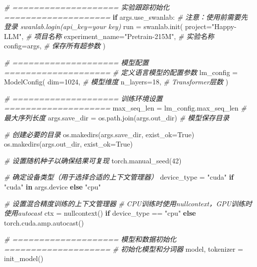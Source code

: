 \documentclass[
]{article}
\newenvironment{Shaded}{}{}
\newcommand{\CommentTok}[1]{\textcolor[rgb]{0.38,0.63,0.69}{\textit{#1}}}
\newcommand{\ControlFlowTok}[1]{\textcolor[rgb]{0.00,0.44,0.13}{\textbf{#1}}}
\newcommand{\DecValTok}[1]{\textcolor[rgb]{0.25,0.63,0.44}{#1}}
\newcommand{\KeywordTok}[1]{\textcolor[rgb]{0.00,0.44,0.13}{\textbf{#1}}}
\newcommand{\NormalTok}[1]{#1}
\newcommand{\OperatorTok}[1]{\textcolor[rgb]{0.40,0.40,0.40}{#1}}
\newcommand{\StringTok}[1]{\textcolor[rgb]{0.25,0.44,0.63}{#1}}
\newcommand{\VariableTok}[1]{\textcolor[rgb]{0.10,0.09,0.49}{#1}}
\begin{document}
\begin{Shaded}
\begin{Highlighting}[]
    \CommentTok{\# ==================== 实验跟踪初始化 ====================}
    \ControlFlowTok{if}\NormalTok{ args.use\_swanlab:}
        \CommentTok{\# 注意：使用前需要先登录 swanlab.login(api\_key=\textquotesingle{}your key\textquotesingle{})}
\NormalTok{        run }\OperatorTok{=}\NormalTok{ swanlab.init(}
\NormalTok{            project}\OperatorTok{=}\StringTok{"Happy{-}LLM"}\NormalTok{,  }\CommentTok{\# 项目名称}
\NormalTok{            experiment\_name}\OperatorTok{=}\StringTok{"Pretrain{-}215M"}\NormalTok{,  }\CommentTok{\# 实验名称}
\NormalTok{            config}\OperatorTok{=}\NormalTok{args,  }\CommentTok{\# 保存所有超参数}
\NormalTok{        )}

    \CommentTok{\# ==================== 模型配置 ====================}
    \CommentTok{\# 定义语言模型的配置参数}
\NormalTok{    lm\_config }\OperatorTok{=}\NormalTok{ ModelConfig(}
\NormalTok{        dim}\OperatorTok{=}\DecValTok{1024}\NormalTok{,      }\CommentTok{\# 模型维度}
\NormalTok{        n\_layers}\OperatorTok{=}\DecValTok{18}\NormalTok{,   }\CommentTok{\# Transformer层数}
\NormalTok{    )}

    \CommentTok{\# ==================== 训练环境设置 ====================}
\NormalTok{    max\_seq\_len }\OperatorTok{=}\NormalTok{ lm\_config.max\_seq\_len  }\CommentTok{\# 最大序列长度}
\NormalTok{    args.save\_dir }\OperatorTok{=}\NormalTok{ os.path.join(args.out\_dir)  }\CommentTok{\# 模型保存目录}
    
    \CommentTok{\# 创建必要的目录}
\NormalTok{    os.makedirs(args.save\_dir, exist\_ok}\OperatorTok{=}\VariableTok{True}\NormalTok{)}
\NormalTok{    os.makedirs(args.out\_dir, exist\_ok}\OperatorTok{=}\VariableTok{True}\NormalTok{)}
    
    \CommentTok{\# 设置随机种子以确保结果可复现}
\NormalTok{    torch.manual\_seed(}\DecValTok{42}\NormalTok{)}
    
    \CommentTok{\# 确定设备类型（用于选择合适的上下文管理器）}
\NormalTok{    device\_type }\OperatorTok{=} \StringTok{"cuda"} \ControlFlowTok{if} \StringTok{"cuda"} \KeywordTok{in}\NormalTok{ args.device }\ControlFlowTok{else} \StringTok{"cpu"}

    \CommentTok{\# 设置混合精度训练的上下文管理器}
    \CommentTok{\# CPU训练时使用nullcontext，GPU训练时使用autocast}
\NormalTok{    ctx }\OperatorTok{=}\NormalTok{ nullcontext() }\ControlFlowTok{if}\NormalTok{ device\_type }\OperatorTok{==} \StringTok{"cpu"} \ControlFlowTok{else}\NormalTok{ torch.cuda.amp.autocast()}

    \CommentTok{\# ==================== 模型和数据初始化 ====================}
    \CommentTok{\# 初始化模型和分词器}
\NormalTok{    model, tokenizer }\OperatorTok{=}\NormalTok{ init\_model()}
    

\end{Highlighting}
\end{Shaded}
\end{document}
